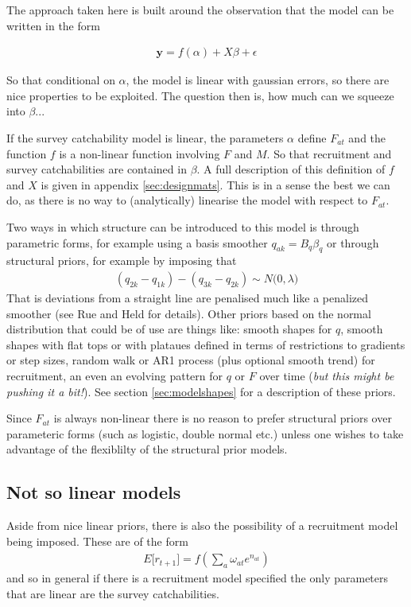 \documentclass[a4paper,english]{article}
\begin{document}
The approach taken here is built around the observation that the model can be written in the form

\begin{align}
  \mathbf{y} = f(\alpha) + X\beta + \epsilon
\end{align}

So that conditional on $\alpha$, the model is linear with gaussian errors, so there are nice properties to be exploited.  The question then is, how much can we squeeze into $\beta$...

If the survey catchability model is linear, the parameters $\alpha$ define $F_{at}$ and the function $f$ is a non-linear function involving $F$ and $M$. So that recruitment and survey catchabilities are contained in $\beta$. A full description of this definition of $f$ and $X$ is given in appendix \ref{sec:designmats}.  This is in a sense the best we can do, as there is no way to (analytically) linearise the model with respect to $F_{at}$.

Two ways in which structure can be introduced to this model is through parametric forms, for example using a basis smoother $q_{ak} = B_q\beta_{q}$ or through structural priors, for example by imposing that
\begin{align*}
  (q_{2k} - q_{1k}) - (q_{3k} - q_{2k}) \sim N\bigg(0, \lambda \bigg)
\end{align*}
That is deviations from a straight line are penalised much like a penalized smoother (see Rue and Held for details).  Other priors based on the normal distribution that could be of use are things like:  smooth shapes for $q$, smooth shapes with flat tops or with plataues defined in terms of restrictions to gradients or step sizes, random walk or AR1 process (plus optional smooth trend) for recruitment, an even an evolving pattern for $q$ or $F$ over time (\emph{but this might be pushing it a bit!}). See section \ref{sec:modelshapes} for a description of these priors.

Since $F_{at}$ is always non-linear there is no reason to prefer structural priors over parameteric forms (such as logistic, double normal etc.) unless one wishes to take advantage of the flexiblilty of the structural prior models.

\subsection{Not so linear models}

Aside from nice linear priors, there is also the possibility of a recruitment model being imposed.  These are of the form
\begin{align}
  E \big[ r_{t+1} \big] = f\left( \sum_a \omega_{at} e^{n_{at}} \right)
\end{align}
and so in general if there is a recruitment model specified the only parameters that are linear are the survey catchabilities.
\end{document}
